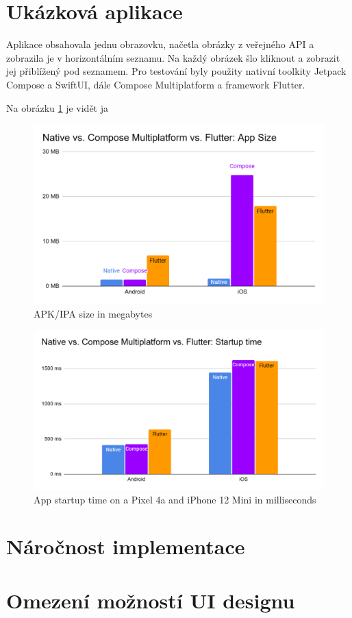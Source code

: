 \section{Ukázková aplikace}

Aplikace obsahovala jednu obrazovku, načetla obrázky z veřejného API a zobrazila je v horizontálním seznamu. 
Na každý obrázek šlo kliknout a zobrazit jej přiblížený pod seznamem. 
Pro testování byly použity nativní toolkity Jetpack Compose a SwiftUI, dále Compose Multiplatform a framework Flutter.  


Na obrázku \ref*{fig:chart_app_sizes} je vidět ja 

\begin{figure}[H]
  \centering
  \includegraphics[width=.7\textwidth]{chart_app_sizes.png}
  \caption{APK/IPA size in megabytes}
  \label{fig:chart_app_sizes}
\end{figure}

\begin{figure}[H]
  \centering
  \includegraphics[width=.7\textwidth]{chart_startup_times.png}
  \caption{App startup time on a Pixel 4a and iPhone 12 Mini in milliseconds}
  \label{fig:chart_startup_times}
\end{figure}

\section{Náročnost implementace}
\section{Omezení možností UI designu}

